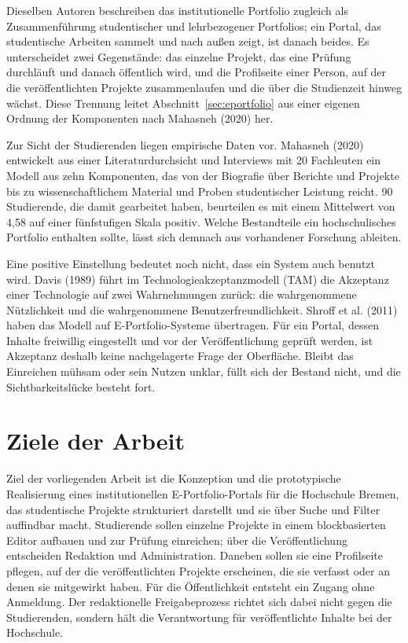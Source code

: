 Dieselben Autoren beschreiben das institutionelle Portfolio zugleich als Zusammenführung studentischer und lehrbezogener Portfolios; ein Portal, das studentische Arbeiten sammelt und nach außen zeigt, ist danach beides. Es unterscheidet zwei Gegenstände: das einzelne Projekt, das eine Prüfung durchläuft und danach öffentlich wird, und die Profilseite einer Person, auf der die veröffentlichten Projekte zusammenlaufen und die über die Studienzeit hinweg wächst. Diese Trennung leitet Abschnitt~\ref{sec:eportfolio} aus einer eigenen Ordnung der Komponenten nach Mahasneh (2020) her.

Zur Sicht der Studierenden liegen empirische Daten vor. Mahasneh (2020) entwickelt aus einer Literaturdurchsicht und Interviews mit 20 Fachleuten ein Modell aus zehn Komponenten, das von der Biografie über Berichte und Projekte bis zu wissenschaftlichem Material und Proben studentischer Leistung reicht. 90 Studierende, die damit gearbeitet haben, beurteilen es mit einem Mittelwert von 4,58 auf einer fünfstufigen Skala positiv. Welche Bestandteile ein hochschulisches Portfolio enthalten sollte, lässt sich demnach aus vorhandener Forschung ableiten.

Eine positive Einstellung bedeutet noch nicht, dass ein System auch benutzt wird. Davis (1989) führt im Technologieakzeptanzmodell (TAM) die Akzeptanz einer Technologie auf zwei Wahrnehmungen zurück: die wahrgenommene Nützlichkeit und die wahrgenommene Benutzerfreundlichkeit. Shroff et al. (2011) haben das Modell auf E-Portfolio-Systeme übertragen. Für ein Portal, dessen Inhalte freiwillig eingestellt und vor der Veröffentlichung geprüft werden, ist Akzeptanz deshalb keine nachgelagerte Frage der Oberfläche. Bleibt das Einreichen mühsam oder sein Nutzen unklar, füllt sich der Bestand nicht, und die Sichtbarkeitslücke besteht fort.

\section{Ziele der Arbeit}
\label{sec:ziele}

Ziel der vorliegenden Arbeit ist die Konzeption und die prototypische Realisierung eines institutionellen E-Portfolio-Portals für die Hochschule Bremen, das studentische Projekte strukturiert darstellt und sie über Suche und Filter auffindbar macht. Studierende sollen einzelne Projekte in einem blockbasierten Editor aufbauen und zur Prüfung einreichen; über die Veröffentlichung entscheiden Redaktion und Administration. Daneben sollen sie eine Profilseite pflegen, auf der die veröffentlichten Projekte erscheinen, die sie verfasst oder an denen sie mitgewirkt haben. Für die Öffentlichkeit entsteht ein Zugang ohne Anmeldung. Der redaktionelle Freigabeprozess richtet sich dabei nicht gegen die Studierenden, sondern hält die Verantwortung für veröffentlichte Inhalte bei der Hochschule.

